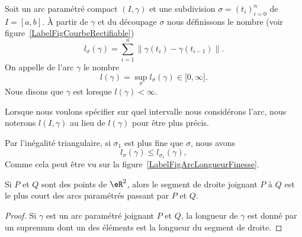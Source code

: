 \newcommand{\CaptionFigCourbeRectifiable}{La longueur d'un découpage. La somme des longueurs des segments droits est facile à calculer.}

\begin{definition}      \label{DEFooDNZWooXmxhsU}
	Soit un arc paramétré compact \( (I,\gamma)\) et une subdivision \( \sigma=(t_i)_{i=0}^n\) de \( I=[a,b]\). À partir de \( \gamma\) et du découpage \( \sigma\) nous définissons le nombre (voir figure~\ref{LabelFigCourbeRectifiable})
	\begin{equation}        \label{Eqlsigmagammasss}
		l_{\sigma}(\gamma)=\sum_{i=1}^n\big\| \gamma(t_i)-\gamma(t_{i-1}) \big\|.
	\end{equation}
	On appelle  de l'arc \( \gamma\) le nombre
	\begin{equation}
		l(\gamma)=\sup_{\sigma}l_{\sigma}(\gamma)\in\mathopen[ 0 , \infty \mathclose].
	\end{equation}
	Nous disons que \( \gamma\) est  lorsque \( l(\gamma)<\infty\).
\end{definition}
Lorsque nous voulons spécifier sur quel intervalle nous considérons l'arc, nous noterons \( l(I,\gamma)\) au lieu de \( l(\gamma)\) pour être plus précis.

Par l'inégalité triangulaire, si \( \sigma_1\) est plus fine que \( \sigma\), nous avons
\begin{equation}
	l_{\sigma}(\gamma)\leq l_{\sigma_1}(\gamma),
\end{equation}
Comme cela peut être vu sur la figure~\ref{LabelFigArcLongueurFinesse}.
\newcommand{\CaptionFigArcLongueurFinesse}{Il est visible que la longueur donnée par l'approximation par des petits segments (verts) est plus longue et plus précise que celle donnée par les longs segments (rouge).}


\begin{proposition}     \label{PROPooCXLYooRpKDMs}
	Si \( P\) et \( Q\) sont des points de \( \eR^2\), alors le segment de droite joignant \( P\) à \( Q\) est le plus court des arcs paramétrés passant par \( P\) et \( Q\).
\end{proposition}

\begin{proof}
	Si \( \gamma\) est un arc paramétré joignant \( P\) et \( Q\), la longueur de \( \gamma\) est donné par un supremum dont un des éléments est la longueur du segment de droite.
\end{proof}

